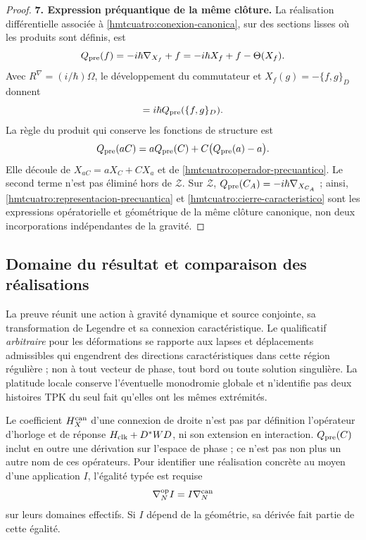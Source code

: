 \begin{proof}
\par\medskip\noindent\textbf{7. Expression préquantique de la même clôture.}\quad
La réalisation différentielle associée à \eqref{hmtcuatro:conexion-canonica}, sur des sections lisses où les produits sont définis, est
\begin{equation}
 Q_{\rm pre}(f)=-i\hbar\nabla_{X_f}+f
            =-i\hbar X_f+f-\Theta(X_f).
 \label{hmtcuatro:operador-precuantico}
\end{equation}
Avec \(R^\nabla=(i/\hbar)\Omega\), le développement du commutateur et \(X_f(g)=-\{f,g\}_D\) donnent
\begin{equation}
 [Q_{\rm pre}(f),Q_{\rm pre}(g)]
           =i\hbar Q_{\rm pre}(\{f,g\}_D).
 \label{hmtcuatro:representacion-precuantica}
\end{equation}
La règle du produit qui conserve les fonctions de structure est
\begin{equation}
 Q_{\rm pre}(aC)
   =aQ_{\rm pre}(C)+C\bigl(Q_{\rm pre}(a)-a\bigr).
 \label{hmtcuatro:funciones-estructura}
\end{equation}
Elle découle de \(X_{aC}=aX_C+CX_a\) et de \eqref{hmtcuatro:operador-precuantico}. Le second terme n’est pas éliminé hors de \(\mathcal Z\). Sur \(\mathcal Z\), \(Q_{\rm pre}(C_A)=-i\hbar\nabla_{X_{C_A}}\) ; ainsi, \eqref{hmtcuatro:representacion-precuantica} et \eqref{hmtcuatro:cierre-caracteristico} sont les expressions opératorielle et géométrique de la même clôture canonique, non deux incorporations indépendantes de la gravité.
\end{proof}

\subsection{Domaine du résultat et comparaison des réalisations}
\label{hmtcuatro:alcance-canonico}

La preuve réunit une action à gravité dynamique et source conjointe, sa transformation de Legendre et sa connexion caractéristique. Le qualificatif \emph{arbitraire} pour les déformations se rapporte aux lapses et déplacements admissibles qui engendrent des directions caractéristiques dans cette région régulière ; non à tout vecteur de phase, tout bord ou toute solution singulière. La platitude locale conserve l’éventuelle monodromie globale et n’identifie pas deux histoires TPK du seul fait qu’elles ont les mêmes extrémités.

Le coefficient \(H_X^{\rm can}\) d’une connexion de droite n’est pas par définition l’opérateur d’horloge et de réponse \(H_{\rm clk}+D^*WD\), ni son extension en interaction. \(Q_{\rm pre}(C)\) inclut en outre une dérivation sur l’espace de phase ; ce n’est pas non plus un autre nom de ces opérateurs. Pour identifier une réalisation concrète au moyen d’une application \(I\), l’égalité typée est requise
\[
 \nabla_N^{\rm op}I=I\nabla_N^{\rm can}
\]
sur leurs domaines effectifs. Si \(I\) dépend de la géométrie, sa dérivée fait partie de cette égalité.

